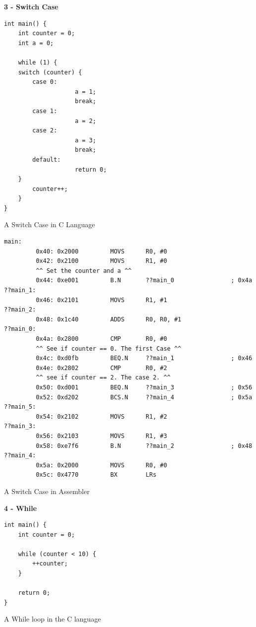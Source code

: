 \documentclass[12pt,a4paper]{report}
\begin{document}
\begin{normalsize}
\textbf{3 - Switch Case} \\

\lstset{language=C}
\begin{lstlisting}
int main() {
    int counter = 0;
    int a = 0;

    while (1) {
	switch (counter) {
		case 0:
                    a = 1;
                    break;
        case 1:
                    a = 2;
		case 2:
                    a = 3;
                    break;
		default:
                    return 0;
	}
        counter++;
    }
}
\end{lstlisting}	
\begin{center}
\small{A Switch Case in C Language}
\end{center}

\lstset{language=[x86masm]Assembler}
\begin{lstlisting}
main:
         0x40: 0x2000         MOVS      R0, #0
         0x42: 0x2100         MOVS      R1, #0
         ^^ Set the counter and a ^^
         0x44: 0xe001         B.N       ??main_0                ; 0x4a
??main_1:
         0x46: 0x2101         MOVS      R1, #1
??main_2:
         0x48: 0x1c40         ADDS      R0, R0, #1
??main_0:
         0x4a: 0x2800         CMP       R0, #0
         ^^ See if counter == 0. The first Case ^^
         0x4c: 0xd0fb         BEQ.N     ??main_1                ; 0x46
         0x4e: 0x2802         CMP       R0, #2
         ^^ see if counter == 2. The case 2. ^^
         0x50: 0xd001         BEQ.N     ??main_3                ; 0x56
         0x52: 0xd202         BCS.N     ??main_4                ; 0x5a
??main_5:
         0x54: 0x2102         MOVS      R1, #2
??main_3:
         0x56: 0x2103         MOVS      R1, #3
         0x58: 0xe7f6         B.N       ??main_2                ; 0x48
??main_4:
         0x5a: 0x2000         MOVS      R0, #0
         0x5c: 0x4770         BX        LRs
\end{lstlisting}	
\begin{center}
\small{A Switch Case in Assembler}
\end{center}


\textbf{4 - While} \\

\lstset{language=C}
\begin{lstlisting}
int main() {
    int counter = 0;

    while (counter < 10) {
        ++counter;
    }

    return 0;
}
\end{lstlisting}	
\begin{center}
\small{A While loop in the C language}
\end{center}


\end{normalsize}
\end{document}
